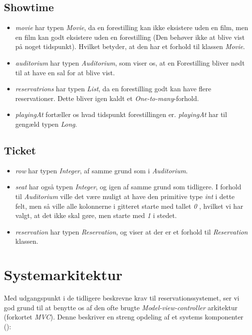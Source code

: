 \subsection{Showtime}

\begin{itemize}
  \item \textit{movie} har typen \textit{Movie}, da en forestilling kan ikke eksistere uden en film, men en film kan godt eksistere uden en forestilling (Den behøver ikke at blive vist på noget tidspunkt). Hvilket betyder, at den har et forhold til klassen \textit{Movie}.
  \item \textit{auditorium} har typen \textit{Auditorium}, som viser os, at en Forestilling bliver nødt til at have en sal for at blive vist. 
  \item \textit{reservatrions} har typen \textit{List}, da en forestilling godt kan have flere reservationer. Dette bliver igen kaldt et \textit{One-to-many}-forhold.
  \item \textit{playingAt} fortæller os hvad tidspunkt forestillingen er. \textit{playingAt} har til gengæld typen \textit{Long}. 
\end{itemize}

\subsection{Ticket}

\begin{itemize}
  \item \textit{row} har typen \textit{Integer}, af samme grund som i \textit{Auditorium}.
  \item \textit{seat} har også typen \textit{Integer}, og igen af samme grund som tidligere. I forhold til \textit{Auditorium} ville det være muligt at have den primitive type \textit{int} i dette felt, men så ville alle kolonnerne i gitteret starte med tallet \textit{0} , hvilket vi har valgt, at det ikke skal gøre, men starte med \textit{1} i stedet.
  \item \textit{reservation} har typen \textit{Reservation}, og viser at der er et forhold til \textit{Reservation} klassen.
\end{itemize}

\section{Systemarkitektur}

Med udgangspunkt i de tidligere beskrevne krav til reservationssystemet, ser vi god grund til at benytte os af den ofte brugte \textit{Model-view-controller} arkitektur (forkortet \textit{MVC}). Denne beskriver en streng opdeling af et systems komponenter (\cite{wiki:mvc}):

